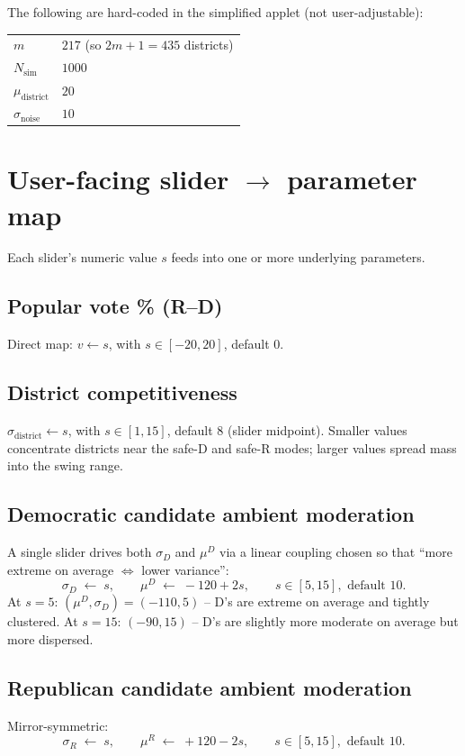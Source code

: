 \documentclass[11pt]{article}
\begin{document}
The following are hard-coded in the simplified applet (not user-adjustable):

\begin{center}
\begin{tabular}{ll}
\toprule
$m$ & $217$ \quad (so $2m+1 = 435$ districts) \\
$N_{\text{sim}}$ & $1000$ \\
$\mu_{\text{district}}$ & $20$ \\
$\sigma_{\text{noise}}$ & $10$ \\
\bottomrule
\end{tabular}
\end{center}

\section{User-facing slider $\to$ parameter map}

Each slider's numeric value $s$ feeds into one or more underlying parameters.

\subsection*{Popular vote \% (R--D)}
Direct map: $v \leftarrow s$, with $s \in [-20, 20]$, default $0$.

\subsection*{District competitiveness}
$\sigma_{\text{district}} \leftarrow s$, with $s \in [1, 15]$, default $8$
(slider midpoint).
Smaller values concentrate districts near the safe-D and safe-R modes; larger
values spread mass into the swing range.

\subsection*{Democratic candidate ambient moderation}
A single slider drives both $\sigma_D$ and $\mu^D$ via a linear coupling
chosen so that ``more extreme on average $\Leftrightarrow$ lower variance'':
\[
  \sigma_D \;\leftarrow\; s,
  \qquad
  \mu^D \;\leftarrow\; -120 + 2 s,
  \qquad s \in [5, 15], \text{ default } 10.
\]
At $s=5$: $(\mu^D, \sigma_D) = (-110, 5)$ -- D's are extreme on average and
tightly clustered. At $s=15$: $(-90, 15)$ -- D's are slightly more moderate
on average but more dispersed.

\subsection*{Republican candidate ambient moderation}
Mirror-symmetric:
\[
  \sigma_R \;\leftarrow\; s,
  \qquad
  \mu^R \;\leftarrow\; +120 - 2 s,
  \qquad s \in [5, 15], \text{ default } 10.
\]
\end{document}
